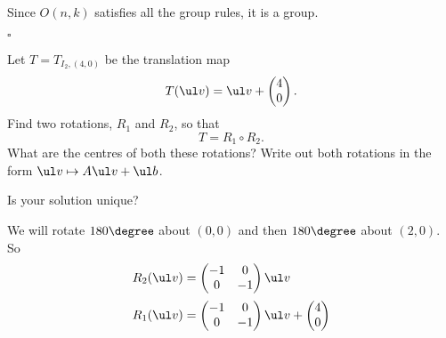 \documentclass[a4paper]{article}
\begin{document}
Since $O(n, k)$ satisfies all the group rules, it is a group.

\hfill $\square$



\begin{questionbody}
%
Let $T = T_{I_2, (4, 0)}$ be the translation map \[
T(\ul v) = \ul v + \begin{pmatrix} 4 \\ 0 \end{pmatrix}.
\] Find two rotations, $R_1$ and $R_2$, so that \[
T = R_1 \circ R_2.
\] What are the centres of both these rotations? Write out both rotations in the form $\ul v \mapsto A \ul v + \ul b$.

Is your solution unique?
\end{questionbody}

We will rotate $180\degree$ about $(0,0)$ and then $180\degree$ about $(2,0)$. So
\begin{align*}
R_2(\ul v) &= \begin{pmatrix} -1 & 0 \\ 0 & -1 \end{pmatrix} \ul v \\[0.5ex]
R_1(\ul v) &= \begin{pmatrix} -1 & 0 \\ 0 & -1 \end{pmatrix} \ul v + \begin{pmatrix} 4 \\ 0 \end{pmatrix}
\end{align*}
\end{document}
